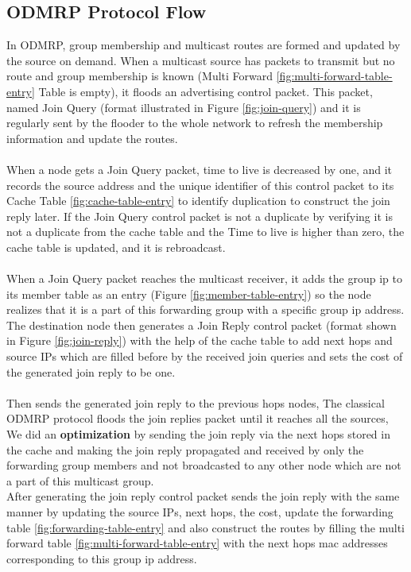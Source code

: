 \subsection{ODMRP Protocol Flow}
\label{sec:odmrp-protocol-flow}
In ODMRP, group membership and multicast routes are formed and updated by the source on demand. When a multicast source has packets to transmit but no route and group membership is known (Multi Forward \ref{fig:multi-forward-table-entry} Table is empty), it floods an advertising control packet. This packet, named Join Query (format illustrated in Figure \ref{fig:join-query}) and it is regularly sent by the flooder to the whole network to refresh the membership information and update the routes.
\\
\\
When a node gets a Join Query packet, time to live is decreased by one, and it records the source address and the unique identifier of this control packet to its Cache Table \ref{fig:cache-table-entry} to identify duplication to construct the join reply later.
If the Join Query control packet is not a duplicate by verifying it is not a duplicate from the cache table and the Time to live is higher than zero, the cache table is updated, and it is rebroadcast.
\\
\\
When a Join Query packet reaches the multicast receiver, it adds the group \acrshort{ip} to its member table as an entry (Figure \ref{fig:member-table-entry}) so the node realizes that it is a part of this forwarding  group with a specific group \acrshort{ip} address.
\\
The destination node then generates a Join Reply control packet (format shown in Figure \ref{fig:join-reply}) with the help of the cache table to add next hops and source IPs which are filled before by the received join queries and sets the cost of the generated join reply to be one.
\\
\\
Then sends the generated join reply to the previous hops nodes, The classical ODMRP protocol floods the join replies packet until it reaches all the sources, We did an \textbf{optimization} by sending the join reply via the next hops stored in the cache and making the join reply propagated and received by only the forwarding group members and not broadcasted to any other node which are not a part of this multicast group.
\\
After generating the join reply control packet sends the join reply with the same manner by updating the source IPs, next hops, the cost, update the forwarding table \ref{fig:forwarding-table-entry} and also construct the routes by filling the multi forward table \ref{fig:multi-forward-table-entry} with the next hops \acrshort{mac} addresses corresponding to this group \acrshort{ip} address.
